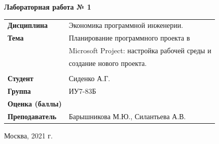 \documentclass[a4paper,14pt]{extreport} %
\begin{document}
\begin{titlepage}
    \vspace{2cm}

    \begin{center}
        \textbf{Лабораторная работа № 1} \\
        \vspace{0.5cm}
    \end{center}

    \vspace{4cm}

    \begin{flushleft}
        \begin{tabular}{ll}
            \textbf{Дисциплина} & Экономика программной инженерии.  \\
            \textbf{Тема} & Планирование программного проекта в \\ 
            & Microsoft Project: настройка рабочей среды и \\
            & создание нового проекта.  \\
            \\
            \textbf{Студент} & Сиденко А.Г. \\
            \textbf{Группа} & ИУ7-83Б \\
            \textbf{Оценка (баллы)} & \\
            \textbf{Преподаватель} & Барышникова М.Ю., Силантьева А.В.   \\
        \end{tabular}
    \end{flushleft}

    \vspace{4cm}

   \begin{center}
        Москва, 2021 г.
    \end{center}

\end{titlepage}
\end{document}
